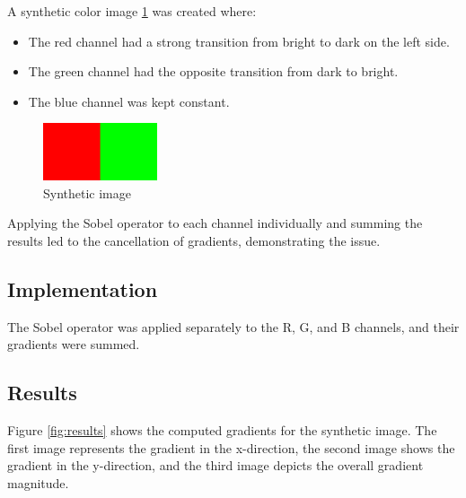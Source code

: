 
A synthetic color image \ref{fig:synthetic} was created where:
\begin{itemize}
    \item The red channel had a strong transition from bright to dark on the left side.
    \item The green channel had the opposite transition from dark to bright.
    \item The blue channel was kept constant.
\end{itemize}

\begin{figure}[h]
    \centering
    \includegraphics[width=0.3\textwidth]{../Images/synthetic_image.png}
    \caption{Synthetic image}
    \label{fig:synthetic}
\end{figure}

Applying the Sobel operator to each channel individually and summing the results led to the cancellation of gradients, demonstrating the issue.

\subsection*{Implementation}
The Sobel operator was applied separately to the R, G, and B channels, and their gradients were summed.
\\



\subsection*{Results}
Figure \ref{fig:results} shows the computed gradients for the synthetic image. The first image represents the gradient in the x-direction, the second image shows the gradient in the y-direction, and the third image depicts the overall gradient magnitude.

